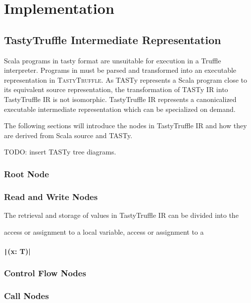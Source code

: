 \chapter{Implementation}

\section{TastyTruffle Intermediate Representation}

Scala programs in \acrshort{tasty} format are unsuitable for execution in a Truffle interpreter. Programs in must be parsed and transformed into an executable representation in \textsc{TastyTruffle}. As TASTy represents a Scala program close to its equivalent source representation, the transformation of TASTy IR into TastyTruffle IR is not isomorphic. 
TastyTruffle IR represents a canonicalized executable intermediate representation which can be specialized on demand. 

The following sections will introduce the nodes in TastyTruffle IR and how they are derived from Scala source and TASTy.

TODO: insert TASTy tree diagrams.

\subsection{Root Node}

\subsection{Read and Write Nodes}

The retrieval and storage of values in TastyTruffle IR can be divided into the 

access or assignment to a local variable, access or assignment to a 

\subsubsection{\texttt|(x: T)|}

\subsection{Control Flow Nodes}

\subsection{Call Nodes}

